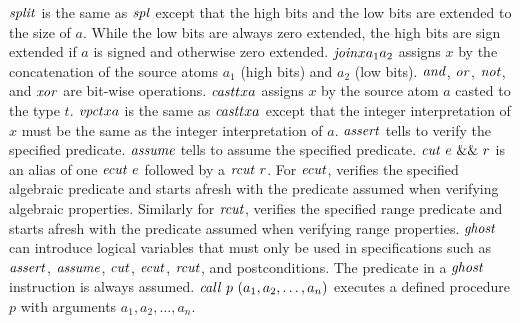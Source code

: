\documentclass{article}
\begin{document}
$\mathit{split}$ is the same as $\mathit{spl}$ except that the high bits and the low
bits are extended to the size of $a$.
While the low bits are always zero extended, the high bits are sign
extended if $a$ is signed and otherwise zero extended.
$\mathit{join} x a_1 a_2$ assigns $x$ by the concatenation of the source
atoms $a_1$ (high bits) and $a_2$ (low bits).
$\mathit{and}$, $\mathit{or}$, $\mathit{not}$, and $\mathit{xor}$ are bit-wise operations.
$\mathit{cast} t x a$ assigns $x$ by the source atom $a$ casted to the type
$t$.
$\mathit{vpc} t x a$ is the same as $\mathit{cast} t x a$ except that the integer
interpretation of $x$ must be the same as the integer interpretation
of $a$.
$\mathit{assert}$ tells \cryptoline to verify the specified predicate.
$\mathit{assume}$ tells \cryptoline to assume the specified predicate.
$\icut\ e\ \band\ r$ is an alias of one $\iecut\ e$ followed by a
$\mathit{rcut}\ r$.
For $\mathit{ecut}$, \cryptoline verifies the specified algebraic predicate
and starts afresh with the predicate assumed when verifying algebraic
properties.
Similarly for $\mathit{rcut}$, \cryptoline verifies the specified range
predicate and starts afresh with the predicate assumed when verifying
range properties.
$\mathit{ghost}$ can introduce logical variables that must only be used in
specifications such as $\mathit{assert}$, $\mathit{assume}$, $\mathit{cut}$, $\mathit{ecut}$,
$\mathit{rcut}$, and postconditions.
The predicate in a $\mathit{ghost}$ instruction is always assumed.
$\mathit{call}\ p\ (a_1, a_2, \ldots, a_n)$ executes a defined procedure $p$
with arguments $a_1, a_2, \ldots, a_n$.
\end{document}
